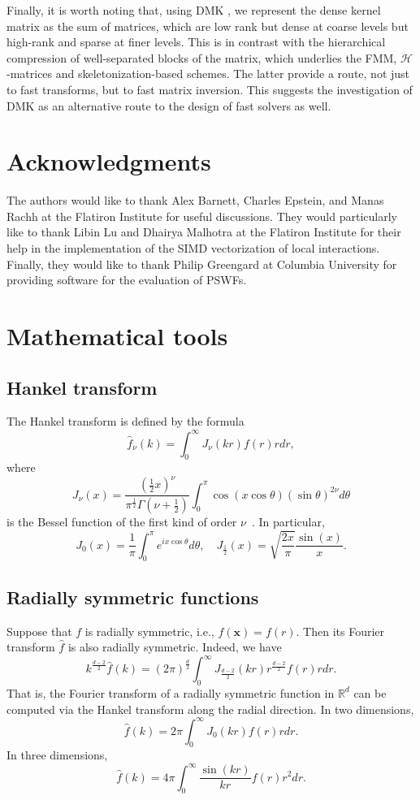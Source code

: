 \documentclass[final,letterpaper]{siamart171218}
\newcommand{\be}{\begin{equation}}
\newcommand{\ee}{\end{equation}}
\newcommand{\x}{\boldsymbol{x}}
\newcommand{\acron}{DMK }
\begin{document}
Finally, it is worth noting that, using \acron, we represent the dense kernel matrix as
the sum of matrices, which are low rank but dense at coarse levels but high-rank and sparse
at finer levels. This is in contrast with the hierarchical compression of well-separated
blocks of the matrix, which underlies the FMM,
${\mathcal H}$-matrices and skeletonization-based schemes. The latter provide a route, not just
to fast transforms, but to fast matrix inversion.
This suggests the investigation of \acron as an
alternative route to the design of fast solvers as well. 


\section*{Acknowledgments}
The authors would like to thank Alex Barnett, Charles Epstein, and Manas Rachh at the
Flatiron Institute for useful discussions. They would particularly like to
thank Libin Lu and Dhairya Malhotra at the Flatiron Institute for their help
in the implementation of the SIMD vectorization of local interactions. Finally,
they would like to thank Philip Greengard at Columbia University
for providing software for the evaluation of PSWFs.






\appendix



\section{Mathematical tools}

\subsection{Hankel transform}
The Hankel transform is defined by the formula
\be
\hat{f}_\nu(k) = \int_0^\infty J_\nu(kr)f(r)rdr,
\ee
where
\be
J_\nu(x)=\frac{\left(\frac{1}{2}x\right)^\nu}{\pi^{\frac{1}{2}}\Gamma\left(\nu+\frac{1}{2}\right)}
\int_0^\pi\cos(x\cos\theta)(\sin\theta)^{2\nu}d\theta
\ee
is the Bessel function of the first kind of order $\nu$~\cite[\S10.9.4]{nisthandbook}.
In particular,
\be
J_0(x)=\frac{1}{\pi}\int_0^\pi e^{ix\cos\theta}d\theta, \quad
  J_{\frac{1}{2}}(x)=\sqrt{\frac{2x}{\pi}}\frac{\sin(x)}{x}.
\ee

\subsection{Radially symmetric functions}
Suppose that $f$ is radially symmetric, i.e., $f(\x)=f(r)$.
Then its Fourier transform $\hat{f}$ is also radially symmetric. Indeed, we have
\be
k^{\frac{d-2}{2}}\hat{f}(k) = (2\pi)^{\frac{d}{2}}\int_0^\infty J_{\frac{d-2}{2}}(kr)r^{\frac{d-2}{2}}f(r)rdr.
\ee
That is, the Fourier transform of a radially symmetric function in $\mathbb{R}^d$ can be
computed via the Hankel transform along the radial direction. In two dimensions,
\be
\hat{f}(k) = 2\pi\int_0^\infty J_{0}(kr)f(r)rdr.
\ee
In three dimensions,
\be\label{rbfft3d}
\hat{f}(k) = 4\pi\int_0^\infty \frac{\sin(kr)}{kr}f(r)r^2dr.
\ee
\end{document}
